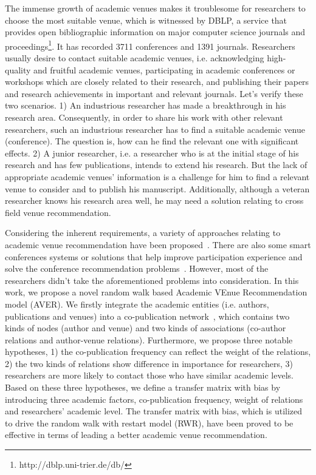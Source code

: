\documentclass[9pt]{acm_proc_article-sp}
\begin{document}
The immense growth of academic venues makes it troublesome for researchers to choose the most suitable venue, which is witnessed by DBLP, a service that provides open bibliographic information on major computer science journals and proceedings\footnote{http://dblp.uni-trier.de/db/}. It has recorded 3711 conferences and 1391 journals. Researchers usually desire to contact suitable academic venues, i.e. acknowledging high-quality and fruitful academic venues, participating in academic conferences or workshops which are closely related to their research, and publishing their papers and research achievements in important and relevant journals. Let's verify these two scenarios. 1) An industrious researcher has made a breakthrough in his research area. Consequently, in order to share his work with other relevant researchers, such an industrious researcher has to find a suitable academic venue (conference). The question is, how can he find the relevant one with significant effects. 2) A junior researcher, i.e. a researcher who is at the initial stage of his research and has few publications, intends to extend his research. But the lack of appropriate academic venues' information is a challenge for him to find a relevant venue to consider and to publish his manuscript. Additionally, although a veteran researcher knows his research area well, he may need a solution relating to cross field venue recommendation.

Considering the inherent requirements, a variety of approaches relating to academic venue recommendation have been proposed~\cite{pham2011clustering,yang2012venue,luong2012publication,chen2012social,asabere2014improving}. There are also some smart conferences systems or solutions that help improve participation experience and solve the conference recommendation problems~\cite{wongchokprasitti2010conference}. However, most of the researchers didn't take the aforementioned problems into consideration. In this work, we propose a novel random walk based Academic VEnue Recommendation model (AVER). We firstly integrate the academic entities (i.e. authors, publications and venues) into a co-publication network~\cite{lemarchand2012long}, which contains two kinds of nodes (author and venue) and two kinds of associations (co-author relations and author-venue relations). Furthermore, we propose three notable hypotheses, 1) the co-publication frequency can reflect the weight of the relations, 2) the two kinds of relations show difference in importance for researchers, 3) researchers are more likely to contact those who have similar academic levels. Based on these three hypotheses, we define a transfer matrix with bias by introducing three academic factors, co-publication frequency, weight of relations and researchers' academic level. The transfer matrix with bias, which is utilized to drive the random walk with restart model (RWR), have been proved to be effective in terms of leading a better academic venue recommendation.
\end{document}

